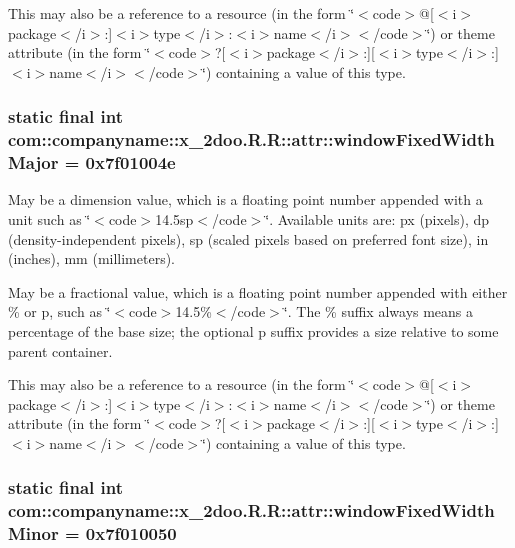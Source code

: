 This may also be a reference to a resource (in the form \char`\"{}$<$code$>$@\mbox{[}$<$i$>$package$<$/i$>$:\mbox{]}$<$i$>$type$<$/i$>$:$<$i$>$name$<$/i$>$$<$/code$>$\char`\"{}) or theme attribute (in the form \char`\"{}$<$code$>$?\mbox{[}$<$i$>$package$<$/i$>$:\mbox{]}\mbox{[}$<$i$>$type$<$/i$>$:\mbox{]}$<$i$>$name$<$/i$>$$<$/code$>$\char`\"{}) containing a value of this type. \hypertarget{classcom_1_1companyname_1_1x__2doo_1_1_r_1_1attr_783737b734e94a569fc9c1cb433ed12e}{
\subsubsection[{windowFixedWidthMajor}]{\setlength{\rightskip}{0pt plus 5cm}static final int com::companyname::x\_\-2doo.R.R::attr::windowFixedWidthMajor = 0x7f01004e}}
\label{classcom_1_1companyname_1_1x__2doo_1_1_r_1_1attr_783737b734e94a569fc9c1cb433ed12e}


May be a dimension value, which is a floating point number appended with a unit such as \char`\"{}$<$code$>$14.5sp$<$/code$>$\char`\"{}. Available units are: px (pixels), dp (density-independent pixels), sp (scaled pixels based on preferred font size), in (inches), mm (millimeters). 

May be a fractional value, which is a floating point number appended with either \% or p, such as \char`\"{}$<$code$>$14.5\%$<$/code$>$\char`\"{}. The \% suffix always means a percentage of the base size; the optional p suffix provides a size relative to some parent container. 

This may also be a reference to a resource (in the form \char`\"{}$<$code$>$@\mbox{[}$<$i$>$package$<$/i$>$:\mbox{]}$<$i$>$type$<$/i$>$:$<$i$>$name$<$/i$>$$<$/code$>$\char`\"{}) or theme attribute (in the form \char`\"{}$<$code$>$?\mbox{[}$<$i$>$package$<$/i$>$:\mbox{]}\mbox{[}$<$i$>$type$<$/i$>$:\mbox{]}$<$i$>$name$<$/i$>$$<$/code$>$\char`\"{}) containing a value of this type. \hypertarget{classcom_1_1companyname_1_1x__2doo_1_1_r_1_1attr_500cd629398e1c2f30d984a150e781e7}{
\subsubsection[{windowFixedWidthMinor}]{\setlength{\rightskip}{0pt plus 5cm}static final int com::companyname::x\_\-2doo.R.R::attr::windowFixedWidthMinor = 0x7f010050}}
\label{classcom_1_1companyname_1_1x__2doo_1_1_r_1_1attr_500cd629398e1c2f30d984a150e781e7}


